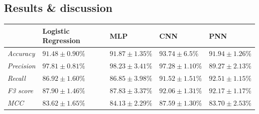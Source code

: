 		\subsection{Results \& discussion} \label{Section: eval/ml/results}
		
		\begin{longtable}{|p{}|p{}|p{}|p{}|p{}|}
			\hline
			& \textbf{Logistic Regression} & \textbf{MLP} & \textbf{CNN} & \textbf{PNN} \\
			\hline
			\textit{Accuracy} & $91.48 \pm 0.90 \%$ &$91.87 \pm 1.35 \%$ & $93.74 \pm 6.5 \%$ &  $91.94 \pm 1.26 \%$ \\
			\hline
			\textit{Precision} & $97.81 \pm 0.81\%$& $98.23 \pm 3.41 \%$ & $97.28 \pm 1.10 \%$ &  $89.27 \pm 2.13 \%$ \\
			\hline
			\textit{Recall} & $86.92 \pm 1.60\%$& $86.85 \pm 3.98 \%$ & $91.52 \pm 1.51 \%$ & $92.51 \pm 1.15 \%$ \\
			\hline
			\textit{F3 score} & $87.90 \pm 1.46 \%$ & $87.83 \pm 3.37 \%$ & $92.06 \pm 1.31 \%$ &  $92.17 \pm 1.17 \%$ \\
			\hline
			\textit{MCC} & $83.62 \pm 1.65\%$& $84.13 \pm 2.29 \%$ & $87.59 \pm 1.30 \%$ &  $83.70 \pm 2.53 \%$\\
			\hline
		\end{longtable}
		
		
		
